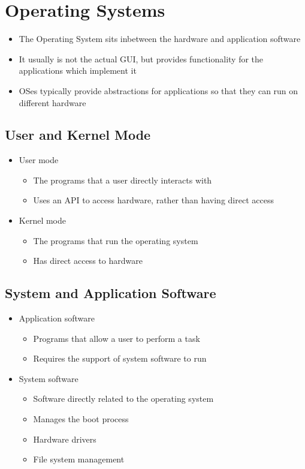 
\section*{Operating Systems}

\begin{itemize}
  \item The Operating System sits inbetween the hardware and application software
  \item It usually is not the actual GUI, but provides functionality for the applications which implement it
  \item OSes typically provide abstractions for applications so that they can run on different hardware
\end{itemize}

\subsection*{User and Kernel Mode}

\begin{itemize}
  \item User mode
  \begin{itemize}
    \item The programs that a user directly interacts with
    \item Uses an API to access hardware, rather than having direct access
  \end{itemize}
  \item Kernel mode
  \begin{itemize}
    \item The programs that run the operating system
    \item Has direct access to hardware
  \end{itemize}
\end{itemize}

\subsection*{System and Application Software}

\begin{itemize}
  \item Application software
  \begin{itemize}
    \item Programs that allow a user to perform a task
    \item Requires the support of system software to run
  \end{itemize}
  \item System software
  \begin{itemize}
    \item Software directly related to the operating system
    \item Manages the boot process
    \item Hardware drivers
    \item File system management
  \end{itemize}
\end{itemize}

